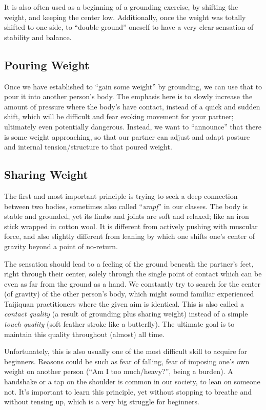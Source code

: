 It is also often used as a beginning of a grounding exercise, by shifting the weight, and keeping the center low.
Additionally, once the weight was totally shifted to one side, to ``double ground'' oneself to have a very clear sensation of stability and balance.

\subsection{Pouring Weight}\label{subsec:pouring-weight}

Once we have established to ``gain some weight'' by grounding, we can use that to pour it into another person's body.
The emphasis here is to slowly increase the amount of pressure where the body's have contact, instead of a quick and sudden shift, which will be difficult and fear evoking movement for your partner; ultimately even potentially dangerous.
Instead, we want to ``announce'' that there is some weight approaching, so that our partner can adjust and adapt posture and internal tension/structure to that poured weight.

\subsection{Sharing Weight}\label{subsec:sharing-weight}

The first and most important principle is trying to seek a deep connection between two bodies, sometimes also called ``\textit{umpf}'' in our classes.
The body is stable and grounded, yet its limbs and joints are soft and relaxed; like an iron stick wrapped in cotton wool.
It is different from actively pushing with muscular force, and also slightly different from leaning by which one shifts one's center of gravity beyond a point of no-return.

The sensation should lead to a feeling of the ground beneath the partner's feet, right through their center, solely through the single point of contact which can be even as far from the ground as a hand.
We constantly try to search for the center (of gravity) of the other person's body, which might sound familiar experienced Taijiquan practitioners where the given aim is identical.
This is also called a \textit{contact quality} (a result of grounding plus sharing weight) instead of a simple \textit{touch quality} (soft feather stroke like a butterfly).
The ultimate goal is to maintain this quality throughout (almost) all time.

Unfortunately, this is also usually one of the most difficult skill to acquire for beginners.
Reasons could be such as fear of falling, fear of imposing one's own weight on another person (``Am I too much/heavy?'', being a burden).
A handshake or a tap on the shoulder is common in our society, to lean on someone not.
It's important to learn this principle, yet without stopping to breathe and without tensing up, which is a very big struggle for beginners.

